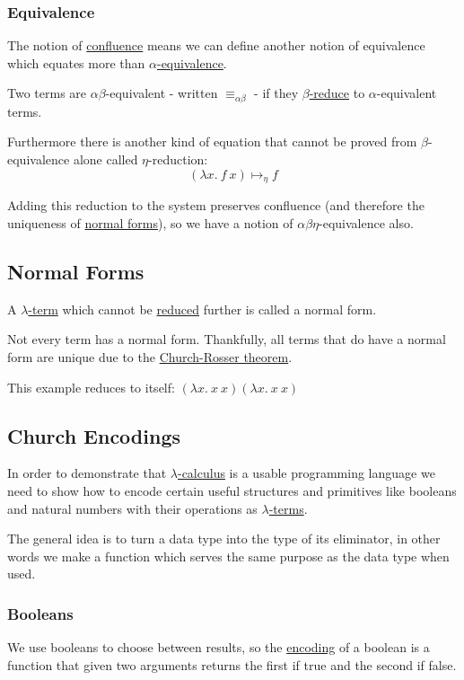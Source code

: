 \documentclass{article}
\begin{document}
\subsubsection{Equivalence}\label{equivalence}
The notion of \hyperref[confluence]{confluence} means we can define another notion of equivalence which equates more than \hyperref[alpha-equivalence]{$\alpha$-equivalence}.

Two terms are $\alpha\beta$-equivalent - written $\equiv_{\alpha\beta}$ - if they \hyperref[beta-reduction]{$\beta$-reduce} to $\alpha$-equivalent terms.

Furthermore there is another kind of equation that cannot be proved from $\beta$-equivalence alone called $\eta$-reduction:
\[(\lambda x.\:f\:x) \mapsto_\eta f\]

Adding this reduction to the system preserves confluence (and therefore the uniqueness of \hyperref[normal-forms]{normal forms}), so we have a notion of $\alpha\beta\eta$-equivalence also.

\subsection{Normal Forms}\label{normal-forms}
A \hyperref[lambda-term]{$\lambda$-term} which cannot be \hyperref[beta-reduction]{reduced} further is called a normal form.

Not every term has a normal form. Thankfully, all terms that do have a normal form are unique due to the \hyperref[church-rosser]{Church-Rosser theorem}.

This example reduces to itself:
$(\lambda x.\:x\:x)(\lambda x.\:x\:x)$

\subsection{Church Encodings}\label{church-encoding}
In order to demonstrate that \hyperref[lambda-calculus]{$\lambda$-calculus} is a usable programming language we need to show how to encode certain useful structures and primitives like booleans and natural numbers with their operations as \hyperref[lambda-term]{$\lambda$-terms}.

The general idea is to turn a data type into the type of its eliminator, in other words we make a function which serves the same purpose as the data type when used.

\subsubsection{Booleans}
We use booleans to choose between results, so the \hyperref[church-encoding]{encoding} of a boolean is a function that given two arguments returns the first if true and the second if false.
\end{document}
